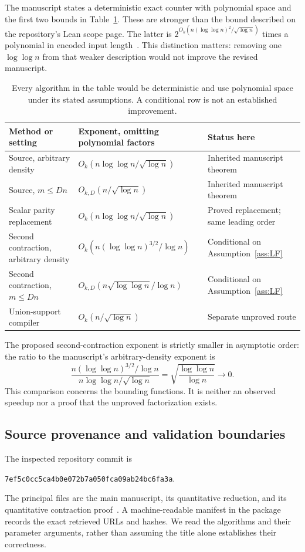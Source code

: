 \documentclass[11pt]{article}
\theoremstyle{definition}
\theoremstyle{remark}
\newcommand{\upstream}{7ef5c0cc5ca4b0e072b7a050fca09ab24bc6fa3a}
\begin{document}
The manuscript states a deterministic exact counter with polynomial space and
the first two bounds in Table~\ref{tab:bounds}. These are stronger than the
bound described on the repository's Lean scope page. The latter is
$2^{O_k(n(\log\log n)^2/\sqrt{\log n})}$ times a polynomial in encoded
input length~\cite{source,scope}. This distinction matters: removing one
$\log\log n$ from that weaker description would not improve the revised
manuscript.

\begin{table}[ht]
\centering\small
\begin{tabularx}{\textwidth}{@{}p{}p{}X@{}}
\toprule
Method or setting & Exponent, omitting polynomial factors & Status here \\
\midrule
Source, arbitrary density & $O_k(n\log\log n/\sqrt{\log n})$ & Inherited manuscript theorem \\
Source, $m\le Dn$ & $O_{k,D}(n/\sqrt{\log n})$ & Inherited manuscript theorem \\
Scalar parity replacement & $O_k(n\log\log n/\sqrt{\log n})$ & Proved replacement; same leading order \\
Second contraction, arbitrary density & $O_k(n(\log\log n)^{3/2}/\log n)$ & Conditional on Assumption~\ref{ass:LF} \\
Second contraction, $m\le Dn$ & $O_{k,D}(n\sqrt{\log\log n}/\log n)$ & Conditional on Assumption~\ref{ass:LF} \\
Union-support compiler & $O_k(n/\sqrt{\log n})$ & Separate unproved route \\
\bottomrule
\end{tabularx}
\caption{Every algorithm in the table would be deterministic and use
polynomial space under its stated assumptions. A conditional row is not an
established improvement.}\label{tab:bounds}
\end{table}

The proposed second-contraction exponent is strictly smaller in asymptotic
order: the ratio to the manuscript's arbitrary-density exponent is
\[
 \frac{n(\log\log n)^{3/2}/\log n}
      {n\log\log n/\sqrt{\log n}}
 =\sqrt{\frac{\log\log n}{\log n}}\longrightarrow0.
\]
This comparison concerns the bounding functions. It is neither an observed
speedup nor a proof that the unproved factorization exists.

\subsection{Source provenance and validation boundaries}
The inspected repository commit is
\begin{center}\texttt{\upstream}.\end{center}
The principal files are the main manuscript, its quantitative reduction, and
its quantitative contraction proof~\cite{source,reduction,contraction}. A
machine-readable manifest in the package records the exact retrieved URLs and
hashes. We read the algorithms and their parameter arguments, rather than
assuming the title alone establishes their correctness.
\end{document}
